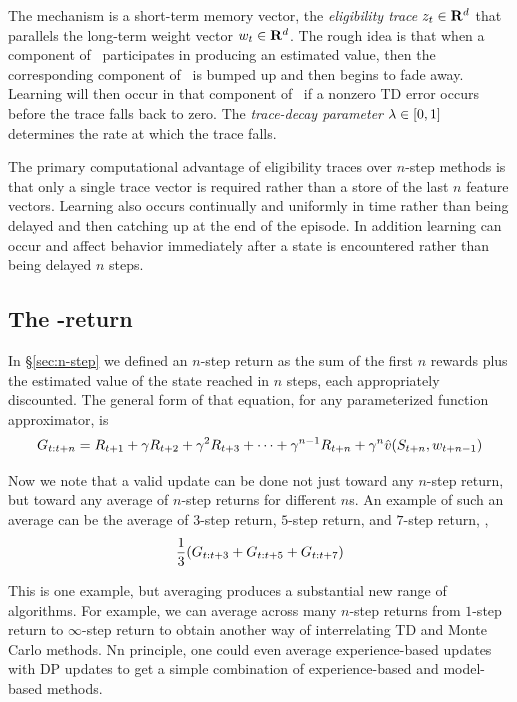 The mechanism is a short-term memory vector,
the \emph{eligibility trace} $z_{t} \in \mathbf{R}^d$
that parallels the long-term weight vector ${w_{t}} \in \mathbf{R}^d$.
The rough idea is that when a component of \ participates in producing an estimated value,
then the corresponding component of \ is bumped up and then begins to fade away.
Learning will then occur in that component of \
if a nonzero TD error occurs before the trace falls back to zero.
The \emph{trace-decay parameter} $\lambda\in[0,1]$
determines the rate at which the trace falls.

The primary computational advantage of eligibility traces over $n$-step methods
is that only a single trace vector is required
rather than a store of the last $n$ feature vectors.
Learning also occurs continually and uniformly in time
rather than being delayed and then catching up at the end of the episode.
In addition
learning can occur and affect behavior
immediately after a state is encountered rather than being delayed $n$ steps.


\subsection{The \tdparam-return}

In \S\ref{sec:n-step} we defined an $n$-step return
as the sum of the first $n$ rewards plus the estimated value of the state reached in $n$ steps,
each appropriately discounted.
The general form of that equation,
for any parameterized function approximator, is
\begin{equation}
\label{eq:nstep-return}
G_{{t}:{t+n}}
=
R_{t+1} + \gamma R_{t+2} + \gamma^2 R_{t+3} + \cdots + \gamma^{n-1} R_{t+n}
+ \gamma^n \hat{v}(S_{t+n}, {w_{t+n-1}})
\end{equation}

Now we note that a valid update can be done not just toward any $n$-step return,
but toward any average of $n$-step returns for different $n$s.
An example of such an average can be
the average of $3$-step return, $5$-step return, and $7$-step return,
\ie,
\begin{equation}
\frac{1}{3}(
G_{{t}:{t+3}}
+G_{{t}:{t+5}}
+G_{{t}:{t+7}}
)
\end{equation}

This is one example, but averaging produces a substantial new range of algorithms.
For example, we can average across many $n$-step returns
from $1$-step return to $\infty$-step return
to obtain another way of interrelating TD and Monte Carlo methods.
Nn principle, one could even average experience-based updates
with DP updates to get a simple combination of experience-based and model-based methods.

